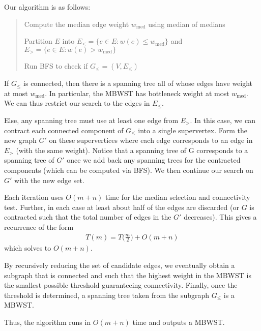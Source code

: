 \documentclass{article}
\begin{document}
\begin{solution}
  Our algorithm is as follows:
  \begin{quote}
    \begin{steps}
      \item Compute the median edge weight \( w_{\text{med}} \) using median of medians 
      \item	Partition \( E \) into \( E_{\leq} = \{ e \in E : w(e) \leq w_{\text{med}} \} \) and \( E_{>} = \{ e \in E : w(e) > w_{\text{med}} \} \)
      \item Run BFS to check if \( G_{\le} = (V, E_{\le}) \) 
    \end{steps}
  \end{quote}

  If \( G_{\le} \) is connected, then there is a spanning tree all of whose edges have weight at most \( w_{\text{med}} \).
  In particular, the MBWST has bottleneck weight at most \( w_{\text{med}} \). We can thus restrict our search to the edges in \( E_{\le} \).

  Else, any spanning tree must use at least one edge from \( E_{>} \).
  In this case, we can contract each connected component of \( G_{\le} \) into a single supervertex.
  Form the new graph \( G' \) on these supervertices where each edge corresponds to an edge in \( E_{>} \) (with the same weight).
  Notice that a spanning tree of G corresponds to a spanning tree of \( G' \) once we add back any spanning trees for the contracted components (which can be computed via BFS).
  We then continue our search on \( G' \) with the new edge set.

\begin{subproof}
  Each iteration uses \( O(m+n) \) time for the median selection and connectivity test.
  Further, in each case at least about half of the edges are discarded (or \( G \) is contracted such that the total number of edges in the \( G' \) decreases).
  This gives a recurrence of the form
  \begin{align*}
    T(m) = T\Big(\frac{m}{2}\Big) + O(m+n)
  \end{align*}
  which solves to \( O(m+n) \).
\end{subproof}

\begin{subproof}[Correctness]
  By recursively reducing the set of candidate edges, we eventually obtain a subgraph that is connected and such that the highest weight in the MBWST is the smallest possible threshold guaranteeing connectivity.
  Finally, once the threshold is determined, a spanning tree taken from the subgraph \( G_\leq \) is a MBWST.
\end{subproof}

  Thus, the algorithm runs in \( O(m+n) \) time and outputs a MBWST.
\end{solution}
\pagebreak
\end{document}
